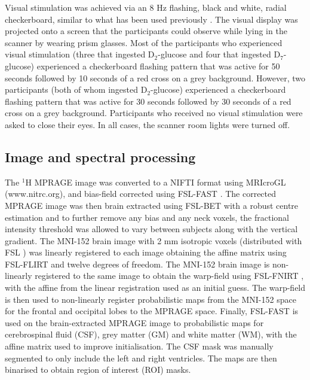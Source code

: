 \documentclass[class=article, crop=false]{standalone}
\begin{document}
Visual stimulation was achieved via an 8 Hz flashing, black and white, radial checkerboard, similar to what has been used previously \cite{Fernandes2020MeasurementT}. The visual display was projected onto a screen that the participants could observe while lying in the scanner by wearing prism glasses. Most of the participants who experienced visual stimulation (three that ingested D$_2$-glucose and four that ingested D$_7$-glucose) experienced a checkerboard flashing pattern that was active for 50 seconds followed by 10 seconds of a red cross on a grey background. However, two participants (both of whom ingested D$_2$-glucose) experienced a checkerboard flashing pattern that was active for 30 seconds followed by 30 seconds of a red cross on a grey background. Participants who received no visual stimulation were asked to close their eyes. In all cases, the scanner room lights were turned off. 

\subsection{Image and spectral processing}

The $^1$H MPRAGE image was converted to a NIFTI format using MRIcroGL (www.nitrc.org), and bias-field corrected using FSL-FAST \cite{Zhang2001SegmentationAlgorithm}. The corrected MPRAGE image was then brain extracted using FSL-BET \cite{Smith2002FastExtraction} with a robust centre estimation and to further remove any bias and any neck voxels, the fractional intensity threshold was allowed to vary between subjects along with the vertical gradient. The MNI-152 brain image with 2 mm isotropic voxels (distributed with FSL \cite{Smith2004AdvancesFSL}) was linearly registered to each image obtaining the affine matrix using FSL-FLIRT \cite{Jenkinson2001AImages, Jenkinson2002ImprovedImages} and twelve degrees of freedom. The MNI-152 brain image is non-linearly registered to the same image to obtain the warp-field using FSL-FNIRT \cite{AnderssonJ2008FNIRT-FMRIBsTool}, with the affine from the linear registration used as an initial guess. The warp-field is then used to non-linearly register probabilistic maps from the MNI-152 space for the frontal and occipital lobes to the MPRAGE space. Finally, FSL-FAST \cite{Zhang2001SegmentationAlgorithm} is used on the brain-extracted MPRAGE image to probabilistic maps for cerebrospinal fluid (CSF), grey matter (GM) and white matter (WM), with the affine matrix used to improve initialisation. The CSF mask was manually segmented to only include the left and right ventricles. The maps are then binarised to obtain region of interest (ROI) masks. 
\end{document}
